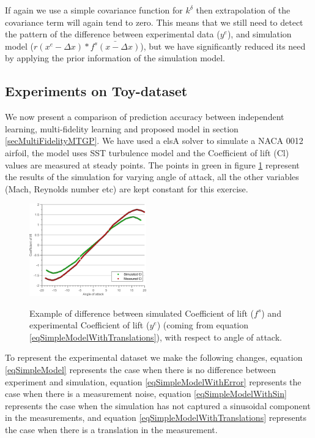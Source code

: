 If again we use a simple covariance function for $k^{\delta}$ then extrapolation of the covariance term will again tend to zero. This means that we still need to detect the pattern of the difference between experimental data ($y^e$), and simulation model ($r(x^{e} -\Delta x )*\bar{f^{s}(x - \Delta x)}$), but we have significantly reduced its need by applying the prior information of the simulation model. 

\subsection{Experiments on Toy-dataset}\label{subsecExpToyDataset}
We now present a comparison of prediction accuracy between independent learning, multi-fidelity learning and proposed model in section \ref{secMultiFidelityMTGP}. We have used a elsA solver to simulate a NACA 0012 airfoil, the model uses SST turbulence model and the Coefficient of lift (Cl) values are measured at steady points. The points in green in figure \ref{subFigmeasuredVssimulatedCl} represent the results of the simulation for varying angle of attack, all the other variables (Mach, Reynolds number etc) are kept constant for this exercise. 

\begin{figure}[!ht]
  \centering
    \includegraphics[width=0.45\textwidth]
        {images/part3/measuredVssimulatedCl}
        \label{subFigmeasuredVssimulatedCl}
       \caption{Example of difference between simulated Coefficient of lift ($f^s$) and experimental Coefficient of lift ($y^e$) (coming from equation \ref{eqSimpleModelWithTranslations}), with respect to angle of attack.}
\end{figure}

To represent the experimental dataset we make the following changes, equation \ref{eqSimpleModel} represents the case when there is no difference between experiment and simulation, equation \ref{eqSimpleModelWithError} represents the case when there is a measurement noise, equation \ref{eqSimpleModelWithSin} represents the case when the simulation has not captured a sinusoidal component in the measurements, and equation \ref{eqSimpleModelWithTranslations} represents the case when there is a translation in the measurement.  

